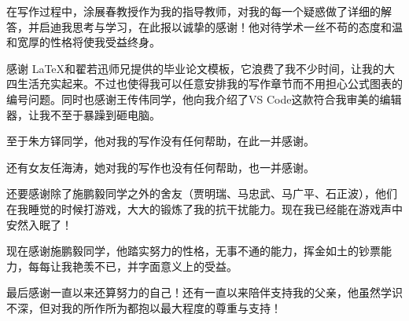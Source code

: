 \begin{acknowledgement}
在写作过程中，涂展春教授作为我的指导教师，对我的每一个疑惑做了详细的解答，并启迪我思考与学习，在此报以诚挚的感谢！他对待学术一丝不苟的态度和温和宽厚的性格将使我受益终身。

感谢 \LaTeX 和翟若迅师兄提供的毕业论文模板，它浪费了我不少时间，让我的大四生活充实起来。不过也使得我可以任意安排我的写作章节而不用担心公式图表的编号问题。同时也感谢王传伟同学，他向我介绍了VS Code这款符合我审美的编辑器，让我不至于暴躁到砸电脑。

至于朱方铎同学，他对我的写作没有任何帮助，在此一并感谢。

还有女友任海涛，她对我的写作也没有任何帮助，也一并感谢。

还要感谢除了施鹏毅同学之外的舍友（贾明瑞、马忠武、马广平、石正波），他们在我睡觉的时候打游戏，大大的锻炼了我的抗干扰能力。现在我已经能在游戏声中安然入眠了！

现在感谢施鹏毅同学，他踏实努力的性格，无事不通的能力，挥金如土的钞票能力，每每让我艳羡不已，并字面意义上的受益。

最后感谢一直以来还算努力的自己！还有一直以来陪伴支持我的父亲，他虽然学识不深，但对我的所作所为都抱以最大程度的尊重与支持！
\end{acknowledgement}

